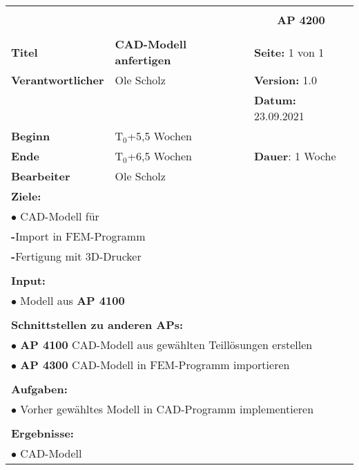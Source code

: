 \clearpage
\begin{table}[!h]
	\begin{center}
		\begin{tabular}{|p{35mm}||p{55mm}|p{50mm}||p{40mm}|}
			\hline
			\multicolumn{3}{|l||}{\textbf{}} & \multicolumn{1}{c|}{}\\
			\multicolumn{3}{|l||}{\textbf{}} & \multicolumn{1}{c|}{\textbf{AP 4200}}\\
			\multicolumn{3}{|l||}{\textbf{}} & \multicolumn{1}{c|}{}\\
			\hline\hline
			\textbf{Titel} & \multicolumn{2}{p{7cm}||}{\textbf{CAD-Modell anfertigen}} 
			& \textbf{Seite:} 1 von 1\\
			\hline
			\textbf{Verantwortlicher} & \multicolumn{2}{l||}{Ole Scholz} & \textbf{Version:} 1.0\\
			\hline
			\multicolumn{3}{|l||}{} & \textbf{Datum:} 23.09.2021\\
			\hline\hline
			\textbf{Beginn} & \multicolumn{2}{l||}{T$_0$+5,5 Wochen} & \\
			\hline
			\textbf{Ende} & \multicolumn{2}{l||}{T$_0$+6,5 Wochen} & \textbf{Dauer}: 1 Woche\\
			\hline\hline
			\textbf{Bearbeiter} & \multicolumn{3}{l|}{Ole Scholz}\\
			\hline\hline
			\multicolumn{4}{|p{150mm}|}{\textbf{Ziele:}}\\
			\multicolumn{4}{|p{150mm}|}{$\bullet$ CAD-Modell für}\\
			\multicolumn{4}{|p{150mm}|}{\qquad \textbf{-}Import in FEM-Programm}\\
			\multicolumn{4}{|p{150mm}|}{\qquad \textbf{-}Fertigung mit 3D-Drucker}\\
			\multicolumn{4}{|p{150mm}|}{}\\
			\multicolumn{4}{|p{150mm}|}{\textbf{Input:}}\\
			\multicolumn{4}{|p{150mm}|}{$\bullet$ Modell aus \textbf{AP 4100}}\\
			\multicolumn{4}{|p{150mm}|}{}\\
			\multicolumn{4}{|p{150mm}|}{\textbf{Schnittstellen zu anderen APs:}}\\
			\multicolumn{4}{|p{150mm}|}{$\bullet$ \textbf{AP 4100} CAD-Modell aus gewählten Teillösungen erstellen}\\
			\multicolumn{4}{|p{150mm}|}{$\bullet$ \textbf{AP 4300} CAD-Modell in FEM-Programm importieren}\\
			\multicolumn{4}{|p{150mm}|}{}\\
			\multicolumn{4}{|p{150mm}|}{\textbf{Aufgaben:}}\\
			\multicolumn{4}{|p{150mm}|}{$\bullet$ Vorher gewähltes Modell in CAD-Programm implementieren}\\
			\multicolumn{4}{|p{150mm}|}{}\\
			\multicolumn{4}{|p{150mm}|}{\textbf{Ergebnisse:}}\\
			\multicolumn{4}{|p{150mm}|}{$\bullet$ CAD-Modell}\\
			\hline
		\end{tabular}
	\end{center}
\end{table}

